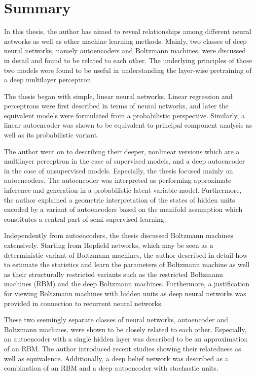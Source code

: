 \documentclass[dissertation,nocontribution]{aaltoseries}
\begin{document}
\section{Summary}

In this thesis, the author has aimed to reveal relationships
among different neural networks as well as other
machine learning methods. Mainly, two classes of deep neural
networks, namely autoencoders and Boltzmann machines, were
discussed in detail and found to be related to each other.
The underlying principles of those two models were found to
be useful in understanding the layer-wise pretraining of a deep
multilayer perceptron.

The thesis began with simple, linear neural networks.
Linear regression and perceptrons were first described in
terms of neural networks, and later the equivalent models
were formulated from a probabilistic perspective. Similarly, a
linear autoencoder was shown to be equivalent to principal
component analysis as well as its probabilistic variant.

The author went on to describing their deeper, nonlinear
versions which are a multilayer perceptron in the case of
supervised models, and a deep autoencoder in the case of
unsupervised models. Especially, the thesis focused mainly
on autoencoders. The autoencoder was interpreted as
performing approximate inference and generation in a
probabilistic latent variable model.  Furthermore, the
author explained a geometric interpretation of the states of
hidden units encoded by a variant of autoencoders based on
the manifold assumption which constitutes a central part of
semi-supervised learning.

Independently from autoencoders, the thesis discussed
Boltzmann machines extensively. Starting from Hopfield
networks, which may be seen as a deterministic variant of
Boltzmann machines, the author described in detail
how to estimate the statistics and learn the parameters of Boltzmann
machine as well as their structurally restricted variants
such as the restricted Boltzmann machines (RBM) and the deep
Boltzmann machines. Furthermore, a justification for viewing
Boltzmann machines with hidden units as deep neural networks
was provided in connection to recurrent neural networks.

These two seemingly separate classes of neural networks,
autoencoder and Boltzmann machines, were shown to be closely
related to each other. Especially, an autoencoder with a
single hidden layer was described to be an approximation of
an RBM. The author introduced recent studies showing their
relatedness as well as equivalence. Additionally, a deep
belief network was described as a combination of an RBM and
a deep autoencoder with stochastic units.
\end{document}
